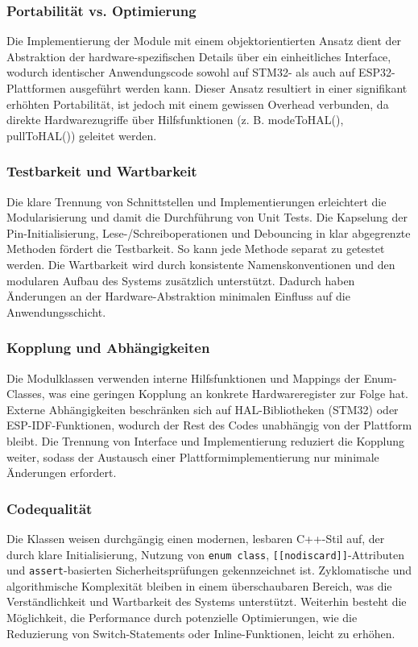 \subsubsection{Portabilität vs. Optimierung}
Die Implementierung der Module mit einem objektorientierten Ansatz dient der Abstraktion der hardware-spezifischen Details über ein einheitliches Interface, wodurch identischer Anwendungscode sowohl auf STM32- als auch auf ESP32-Plattformen ausgeführt werden kann. 
Dieser Ansatz resultiert in einer signifikant erhöhten Portabilität, ist jedoch mit einem gewissen Overhead verbunden, da direkte Hardwarezugriffe über Hilfsfunktionen (z. B. modeToHAL(), pullToHAL()) geleitet werden. 

\subsubsection{Testbarkeit und Wartbarkeit}
Die klare Trennung von Schnittstellen und Implementierungen erleichtert die Modularisierung und damit die Durchführung von Unit Tests.
Die Kapselung der Pin-Initialisierung, Lese-/Schreiboperationen und Debouncing in klar abgegrenzte Methoden fördert die Testbarkeit. 
So kann jede Methode separat zu getestet werden. 
Die Wartbarkeit wird durch konsistente Namenskonventionen und den modularen Aufbau des Systems zusätzlich unterstützt. 
Dadurch haben Änderungen an der Hardware-Abstraktion minimalen Einfluss auf die Anwendungsschicht.

\subsubsection{Kopplung und Abhängigkeiten}
Die Modulklassen verwenden interne Hilfsfunktionen und Mappings der Enum-Classes, was eine geringen Kopplung an konkrete Hardwareregister zur Folge hat. 
Externe Abhängigkeiten beschränken sich auf HAL-Bibliotheken (STM32) oder ESP-IDF-Funktionen, wodurch der Rest des Codes unabhängig von der Plattform bleibt. 
Die Trennung von Interface und Implementierung reduziert die Kopplung weiter, sodass der Austausch einer Plattformimplementierung nur minimale Änderungen erfordert.

\subsubsection{Codequalität}
Die Klassen weisen durchgängig einen modernen, lesbaren C++-Stil auf, der durch klare Initialisierung, Nutzung von \texttt{enum class}, \texttt{[[nodiscard]]}-Attributen und \texttt{assert}-basierten Sicherheitsprüfungen gekennzeichnet ist. 
Zyklomatische und algorithmische Komplexität bleiben in einem überschaubaren Bereich, was die Verständlichkeit und Wartbarkeit des Systems unterstützt.
Weiterhin besteht die Möglichkeit, die Performance durch potenzielle Optimierungen, wie die Reduzierung von Switch-Statements oder Inline-Funktionen, leicht zu erhöhen.

